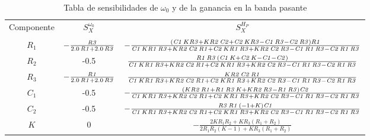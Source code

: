 \begin{table}[H]
\centering
\begin{tabular}{ccc}
\hline
Componente & $S_X^{\omega_0}$ & $S_X^{H_P}$ \\ \cline{1-3}\\
$R_1$  & $-{\frac {{\it R3}}{ 2.0\,{\it R1}+ 2.0\,{\it R3}}}$    &$ -{\frac { \left( {\it C1}\,K{\it R3}+K{\it R2}\,{\it C2}+{\it C2}\,K{
\it R3}-{\it C1}\,{\it R3}-{\it C2}\,{\it R3} \right) {\it R1}}{{\it 
C1}\,K{\it R1}\,{\it R3}+K{\it R2}\,{\it C2}\,{\it R1}+{\it C2}\,K{
\it R1}\,{\it R3}+K{\it R2}\,{\it C2}\,{\it R3}-{\it C1}\,{\it R1}\,{
\it R3}-{\it C2}\,{\it R1}\,{\it R3}}} $  \\
$R_2$  & -0.5    & ${\frac {{\it R1}\,{\it R3}\, \left( {\it C1}\,K+{\it C2}\,K-{\it C1}-{
\it C2} \right) }{{\it C1}\,K{\it R1}\,{\it R3}+K{\it R2}\,{\it C2}\,{
\it R1}+{\it C2}\,K{\it R1}\,{\it R3}+K{\it R2}\,{\it C2}\,{\it R3}-{
\it C1}\,{\it R1}\,{\it R3}-{\it C2}\,{\it R1}\,{\it R3}}}$   \\
$R_3$  & $-{\frac {{\it R1}}{ 2.0\,{\it R1}+ 2.0\,{\it R3}}}$     & ${\frac {K{\it R2}\,{\it C2}\,{\it R1}}{{\it C1}\,K{\it R1}\,{\it R3}+K
{\it R2}\,{\it C2}\,{\it R1}+{\it C2}\,K{\it R1}\,{\it R3}+K{\it R2}\,
{\it C2}\,{\it R3}-{\it C1}\,{\it R1}\,{\it R3}-{\it C2}\,{\it R1}\,{
\it R3}}}$   \\
$C_1$  & -0.5    & $-{\frac { \left( K{\it R2}\,{\it R1}+{\it R1}\,{\it R3}\,K+K{\it R2}\,
{\it R3}-{\it R1}\,{\it R3} \right) {\it C2}}{{\it C1}\,K{\it R1}\,{
\it R3}+K{\it R2}\,{\it C2}\,{\it R1}+{\it C2}\,K{\it R1}\,{\it R3}+K{
\it R2}\,{\it C2}\,{\it R3}-{\it C1}\,{\it R1}\,{\it R3}-{\it C2}\,{
\it R1}\,{\it R3}}}$ \\  

$C_2$  & -0.5    & $-{\frac {{\it R3}\,{\it R1}\, \left( -1+K \right) {\it C1}}{{\it C1}\,
K{\it R1}\,{\it R3}+K{\it R2}\,{\it C2}\,{\it R1}+{\it C2}\,K{\it R1}
\,{\it R3}+K{\it R2}\,{\it C2}\,{\it R3}-{\it C1}\,{\it R1}\,{\it R3}-
{\it C2}\,{\it R1}\,{\it R3}}}$  \\
 $K$ & 0&$-\frac{2KR_1R_2+KR_3(R_1+R_2)}{2R_1R_2(K-1)+KR_3(R_1+R_2)}$  \\
\hline
\end{tabular}
\caption{Tabla de sensibilidades de $\omega_0$ y de la ganancia en la banda pasante}
\label{tab:SENS_W_HP}
\end{table}
